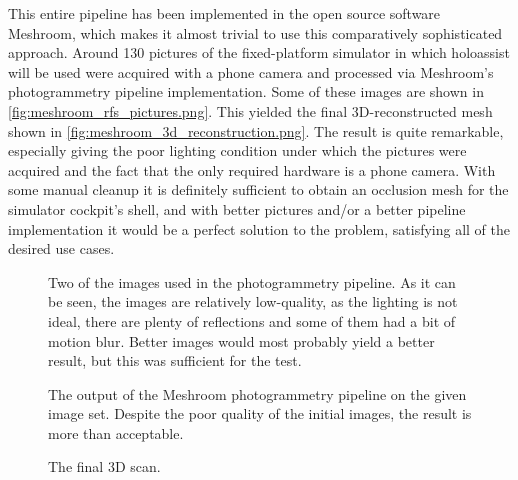 This entire pipeline has been implemented in the open source software Meshroom\cite{alicevision_meshroom_nodate}, which makes it almost trivial to use this comparatively sophisticated approach. Around 130 pictures of the fixed-platform simulator in which \gls{holoassist} will be used were acquired with a phone camera and processed via Meshroom's photogrammetry pipeline implementation. Some of these images are shown in \autoref{fig:meshroom_rfs_pictures.png}. This yielded the final 3D-reconstructed mesh shown in \autoref{fig:meshroom_3d_reconstruction.png}. The result is quite remarkable, especially giving the poor lighting condition under which the pictures were acquired and the fact that the only required hardware is a phone camera. With some manual cleanup it is definitely sufficient to obtain an occlusion mesh for the simulator cockpit's shell, and with better pictures and/or a better pipeline implementation\cite{knapitsch_tanks_2017} it would be a perfect solution to the problem, satisfying all of the desired use cases.

\begin{figure}[p]
  \centering
  \hfill
  \caption{Two of the images used in the photogrammetry pipeline. As it can be seen, the images are relatively low-quality, as the lighting is not ideal, there are plenty of reflections and some of them had a bit of motion blur. Better images would most probably yield a better result, but this was sufficient for the test.}\label{fig:meshroom_rfs_pictures.png}
\end{figure}

\begin{figure}[p]
  \centering
  \hfill
  \caption{The output of the Meshroom photogrammetry pipeline on the given image set. Despite the poor quality of the initial images, the result is more than acceptable.}\label{fig:meshroom_3d_reconstruction.png}
\end{figure}

\begin{figure}[p]
  \centering
  \hfill
  \caption{The final 3D scan.}\label{fig:simulator_3d_scan.png}
\end{figure}

